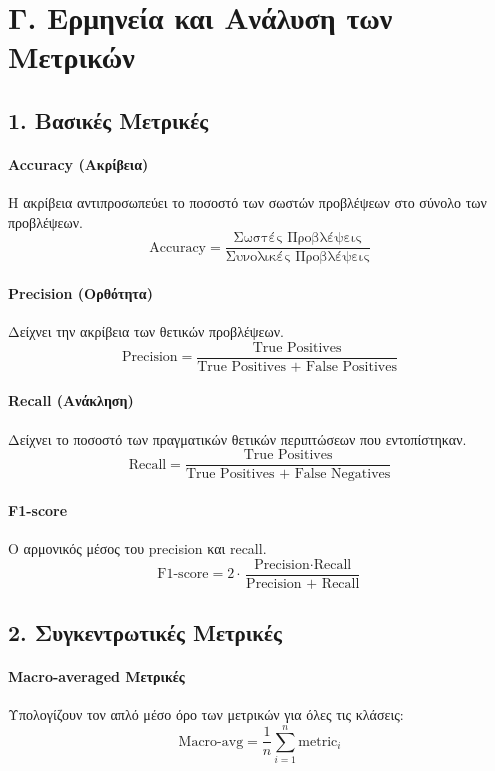 \documentclass[a4paper,12pt]{article}
\begin{document}
\section*{Γ. Ερμηνεία και Ανάλυση των Μετρικών}

\subsection*{1. Βασικές Μετρικές}

\paragraph{Accuracy (Ακρίβεια)}
Η ακρίβεια αντιπροσωπεύει το ποσοστό των σωστών προβλέψεων στο σύνολο των προβλέψεων.
\[ \text{Accuracy} = \frac{\text{Σωστές Προβλέψεις}}{\text{Συνολικές Προβλέψεις}} \]

\paragraph{Precision (Ορθότητα)}
Δείχνει την ακρίβεια των θετικών προβλέψεων.
\[ \text{Precision} = \frac{\text{True Positives}}{\text{True Positives + False Positives}} \]

\paragraph{Recall (Ανάκληση)}
Δείχνει το ποσοστό των πραγματικών θετικών περιπτώσεων που εντοπίστηκαν.
\[ \text{Recall} = \frac{\text{True Positives}}{\text{True Positives + False Negatives}} \]

\paragraph{F1-score}
Ο αρμονικός μέσος του precision και recall.
\[ \text{F1-score} = 2 \cdot \frac{\text{Precision} \cdot \text{Recall}}{\text{Precision + Recall}} \]

\subsection*{2. Συγκεντρωτικές Μετρικές}

\paragraph{Macro-averaged Μετρικές}
Υπολογίζουν τον απλό μέσο όρο των μετρικών για όλες τις κλάσεις:
\[ \text{Macro-avg} = \frac{1}{n}\sum_{i=1}^{n} \text{metric}_i \]
\end{document}
